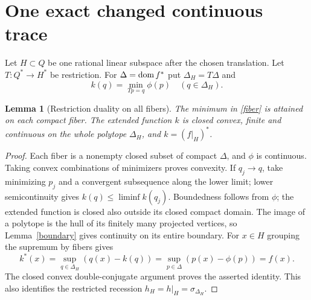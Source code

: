 \documentclass[11pt]{article}
\newtheorem{lemma}[theorem]{Lemma}
\theoremstyle{definition}\newtheorem{definition}[theorem]{Definition}
\theoremstyle{remark}\newtheorem{remark}[theorem]{Remark}
\begin{document}
\section{One exact changed continuous trace}
Let $H\subset Q$ be one rational linear subspace after the chosen translation. Let $T:Q^*\to H^*$ be restriction. For $\Delta=\operatorname{dom} f^*$ put $\Delta_H=T\Delta$ and
\begin{equation}\label{fiber}
k(q)=\min_{Tp=q}\phi(p)\quad(q\in\Delta_H).
\end{equation}
\begin{lemma}[Restriction duality on all fibers]\label{restriction}
The minimum in \eqref{fiber} is attained on each compact fiber. The extended function $k$ is closed convex, finite and continuous on the whole polytope $\Delta_H$, and $k=(f|_H)^*$.
\end{lemma}
\begin{proof}
Each fiber is a nonempty closed subset of compact $\Delta$, and $\phi$ is continuous. Taking convex combinations of minimizers proves convexity. If $q_j\to q$, take minimizing $p_j$ and a convergent subsequence along the lower limit; lower semicontinuity gives $k(q)\leq\liminf k(q_j)$. Boundedness follows from $\phi$; the extended function is closed also outside its closed compact domain. The image of a polytope is the hull of its finitely many projected vertices, so Lemma~\ref{boundary} gives continuity on its entire boundary. For $x\in H$ grouping the supremum by fibers gives
\[
k^*(x)=\sup_{q\in\Delta_H}(q(x)-k(q))=\sup_{p\in\Delta}(p(x)-\phi(p))=f(x).
\]
The closed convex double-conjugate argument proves the asserted identity. This also identifies the restricted recession $h_H=h|_H=\sigma_{\Delta_H}$.
\end{proof}
\end{document}
